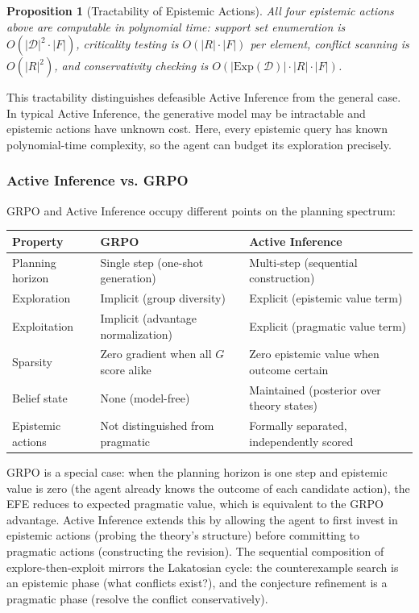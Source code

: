 \documentclass[11pt]{article}
\newtheorem{proposition}{Proposition}
\newcommand{\D}{\mathcal{D}}
\newcommand{\Exp}{\mathrm{Exp}}
\begin{document}
\begin{proposition}[Tractability of Epistemic Actions]
All four epistemic actions above are computable in polynomial time: support set enumeration is $O(|\D|^2 \cdot |F|)$, criticality testing is $O(|R| \cdot |F|)$ per element, conflict scanning is $O(|R|^2)$, and conservativity checking is $O(|\Exp(\D)| \cdot |R| \cdot |F|)$.
\end{proposition}

This tractability distinguishes defeasible Active Inference from the general case. In typical Active Inference, the generative model may be intractable and epistemic actions have unknown cost. Here, every epistemic query has known polynomial-time complexity, so the agent can budget its exploration precisely.

\subsubsection{Active Inference vs. GRPO}

GRPO and Active Inference occupy different points on the planning spectrum:

\begin{center}
\small
\begin{tabular}{@{}lll@{}}
\toprule
Property & GRPO & Active Inference \\
\midrule
Planning horizon & Single step (one-shot generation) & Multi-step (sequential construction) \\
Exploration & Implicit (group diversity) & Explicit (epistemic value term) \\
Exploitation & Implicit (advantage normalization) & Explicit (pragmatic value term) \\
Sparsity & Zero gradient when all $G$ score alike & Zero epistemic value when outcome certain \\
Belief state & None (model-free) & Maintained (posterior over theory states) \\
Epistemic actions & Not distinguished from pragmatic & Formally separated, independently scored \\
\bottomrule
\end{tabular}
\end{center}

GRPO is a special case: when the planning horizon is one step and epistemic value is zero (the agent already knows the outcome of each candidate action), the EFE reduces to expected pragmatic value, which is equivalent to the GRPO advantage. Active Inference extends this by allowing the agent to first invest in epistemic actions (probing the theory's structure) before committing to pragmatic actions (constructing the revision). The sequential composition of explore-then-exploit mirrors the Lakatosian cycle: the counterexample search is an epistemic phase (what conflicts exist?), and the conjecture refinement is a pragmatic phase (resolve the conflict conservatively).
\end{document}
